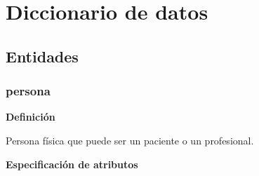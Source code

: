 \documentclass[a4paper,11pt]{article}
\begin{document}
\FloatBarrier


%
%
%


\section{\textbf{Diccionario de datos}}

\subsection{\textbf{Entidades}}


\subsubsection{\textbf{persona}}

\textbf{Definición}

Persona física que puede ser un paciente o un profesional.

\textbf{Especificación de atributos}
\end{document}
